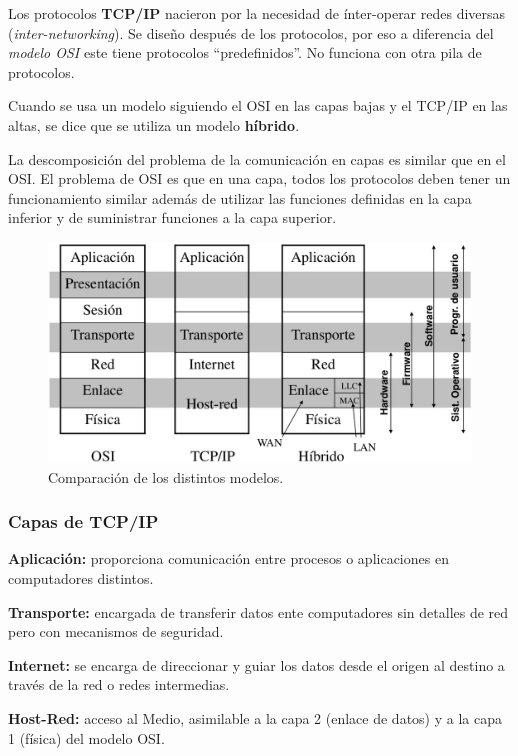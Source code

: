 \documentclass[10pt,a4paper]{article}
\begin{document}
Los protocolos \textbf{TCP/IP} nacieron por la necesidad de ínter-operar redes diversas (\textit{inter-networking}). Se diseño después de los protocolos, por eso a diferencia del \textit{modelo OSI} este tiene protocolos ``predefinidos''. No funciona con otra pila de protocolos.

Cuando se usa un modelo siguiendo el OSI en las capas bajas y el TCP/IP en las altas, se dice que se utiliza un modelo \textbf{híbrido}.

La descomposición del problema de la comunicación en capas es similar que en el OSI. El problema de OSI es que en una capa, todos los protocolos deben tener un funcionamiento similar además de utilizar las funciones definidas en la capa inferior y de suministrar funciones a la capa superior.

\begin{figure}[ht!]
  \caption{Comparación de los distintos modelos.}
  \label{fig:comparacion_modelos}  
  \centerline{\includegraphics[width=0.8\textwidth-\fboxrule-\fboxrule]{imgs/comparacion_modelos.png}}  
\end{figure}

\subsubsection{Capas de TCP/IP}
\begin{description}
\item \textbf{Aplicación:} proporciona comunicación entre procesos o aplicaciones en computadores distintos.
\item \textbf{Transporte:} encargada de transferir datos ente computadores sin detalles de red pero con mecanismos de seguridad.
\item \textbf{Internet:} se encarga de direccionar y guiar los datos desde el origen al destino a través de la red o redes intermedias.
\item \textbf{Host-Red:} acceso al Medio, asimilable a la capa 2 (enlace de datos) y a la capa 1 (física) del modelo OSI.
\end{description}
\end{document}
